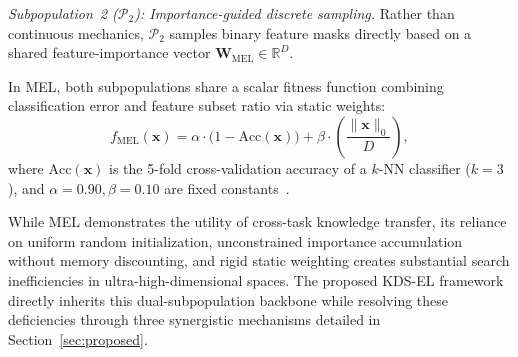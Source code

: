 \textit{Subpopulation~2 ($\mathcal{P}_2$): Importance-guided discrete sampling.} Rather than continuous mechanics, $\mathcal{P}_2$ samples binary feature masks directly based on a shared feature-importance vector $\mathbf{W}_{\mathrm{MEL}} \in \mathbb{R}^D$.

In MEL, both subpopulations share a scalar fitness function combining classification error and feature subset ratio via static weights:
\begin{equation}
f_{\mathrm{MEL}}(\mathbf{x}) = \alpha \cdot \bigl(1 - \mathrm{Acc}(\mathbf{x})\bigr) + \beta \cdot \left(\frac{\|\mathbf{x}\|_0}{D}\right),
\label{eq:fitness_mel}
\end{equation}
where $\mathrm{Acc}(\mathbf{x})$ is the 5-fold cross-validation accuracy of a $k\text{-NN}$ classifier ($k=3$), and $\alpha = 0.90, \beta = 0.10$ are fixed constants~\cite{mel2024}.

While MEL demonstrates the utility of cross-task knowledge transfer, its reliance on uniform random initialization, unconstrained importance accumulation without memory discounting, and rigid static weighting creates substantial search inefficiencies in ultra-high-dimensional spaces. The proposed KDS-EL framework directly inherits this dual-subpopulation backbone while resolving these deficiencies through three synergistic mechanisms detailed in Section~\ref{sec:proposed}.

